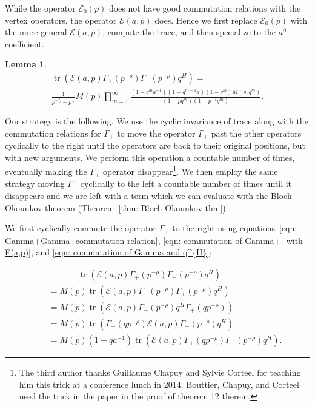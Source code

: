 \documentclass[12pt]{amsart}
\newcommand{\half}{\frac{1}{2}}
\newtheorem{lemma}[theorem]{Lemma}
\theoremstyle{definition}
\newcommand{\tr}{\operatorname{tr}}
\newcommand{\E}{\mathcal{E}}
\newcommand{\ptotheminusrho}{p^{-\rho}}
\begin{document}
While the operator $\E_{0}(p)$ does not have good commutation
relations with the vertex operators, the operator $\E (a,p)$
does. Hence we first replace $\E_{0}(p)$ with the more general $\E
(a,p)$, compute the trace, and then specialize to the $a^{0}$
coefficient.
\begin{lemma}\label{lem: trace of E Gamma+Gamma-q^{H}}
\begin{multline*}
\tr \left(\E (a,p)\Gamma_{+}(\ptotheminusrho )\Gamma_{-}(\ptotheminusrho )q^{H}
\right) = \\
\frac{1}{p^{-\half}-p^{\half}}M(p)\prod_{m=1}^{\infty}
\frac{(1-q^{m}a^{-1})(1-q^{m-1}a)(1-q^{m})
M(p,q^{m})}{(1-pq^{m})(1-p^{-1}q^{m})}.
\end{multline*}
\end{lemma}
\proof Our strategy is the following. We use the cyclic invariance of
trace along with the commutation relations for $\Gamma_{+}$ to move
the operator $\Gamma_{+}$ past the other operators cyclically to the
right until the operators are back to their original positions, but
with new arguments. We perform this operation a countable number of
times, eventually making the $\Gamma_{+}$ operator
disappear\footnote{The third author thanks Guillaume Chapuy and Sylvie
Corteel for teaching him this trick at a conference lunch in
2014. Bouttier, Chapuy, and Corteel used the trick in the paper
\cite{Bouttier-Chapuy-Corteel} in the proof of theorem 12
therein.}. We then employ the same strategy moving $\Gamma_{-}$
cyclically to the left a countable number of times until it disappears
and we are left with a term which we can evaluate with the
Bloch-Okounkov theorem (Theorem~\ref{thm: Bloch-Okounkov thm}).

We first cyclically commute the operator $\Gamma_{+}$ to the right
using equations~\eqref{eqn: Gamma+Gamma- commutation relation},
\eqref{eqn: commutation of Gamma+- with E(a,p)}, and \eqref{eqn:
commutation of Gamma and q^{H}}:

\begin{align*}
\quad &\quad \quad \quad \,\,\, \tr (\E (a,p)\Gamma_{+}(\ptotheminusrho)\Gamma_{-}(\ptotheminusrho
)q^{H})\\
& = M(p)\tr (\E (a,p)\Gamma_{-}(\ptotheminusrho)\Gamma_{+}(\ptotheminusrho
)q^{H})\\
& = M(p)\tr (\E (a,p)\Gamma_{-}(\ptotheminusrho)q^{H}\Gamma_{+}(q\ptotheminusrho
))\\
& = M(p)\tr (\Gamma_{+}(q\ptotheminusrho
)\E (a,p)\Gamma_{-}(\ptotheminusrho)q^{H})\\
& = M(p)(1-qa^{-1})\tr (\E (a,p)\Gamma_{+}(q\ptotheminusrho) \Gamma_{-}(\ptotheminusrho)q^{H}).
\end{align*}
\end{document}
